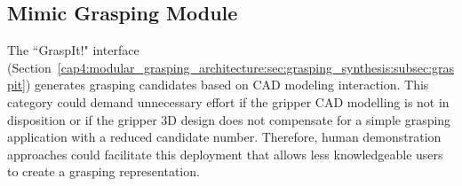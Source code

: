 
\subsection{Mimic Grasping Module}
\label{cap4:modular_grasping_architecture:sec:grasping_synthesis:subsec:mimic_grasping}

The ``GraspIt!" interface (Section~\ref{cap4:modular_grasping_architecture:sec:grasping_synthesis:subsec:graspit}) generates grasping candidates based on CAD modeling interaction. This category could demand unnecessary effort if the gripper CAD modelling is not in disposition or if the gripper 3D design does not compensate for a simple grasping application with a reduced candidate number. Therefore, human demonstration approaches could facilitate this deployment that allows less knowledgeable users to create a grasping representation.  


